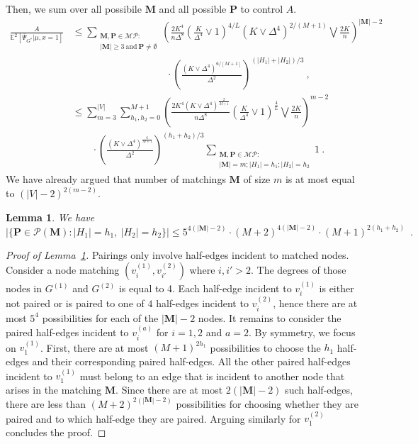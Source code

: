 \documentclass{article}
\newtheorem{lemma}{Lemma}
\begin{document}
Then, we sum over all possibile $\mathbf{M}$ and all possible $\mathbf{P}$ to control $A$. 
\begin{align*}
\frac{A}{\mathbb E^2[\overline{\Psi}_{G^*}|\mu,x=1]}&\leq  \sum_{\substack{\mathbf{M},\mathbf{P}\in \mathcal{MP}:\\|\mathbf{M}|\geq 3~\mathrm{and}~\mathbf{P} \neq \emptyset} } \left(\frac{2K^4}{n\Delta^8} \left(\frac{K}{\Delta^4}\vee 1 \right)^{4/L}(K\vee \Delta^4)^{2/(M+1)}\bigvee \frac{2K}{n} \right)^{|\mathbf{M}|-2} \\ &\hspace{4cm}  \cdot \left(\frac{(K\vee \Delta^4)^{6/[M+1]}}{\Delta^{2}} \right)^{(|H_1|+|H_2|)/3} \  , \\
&\leq 
\sum_{m=3}^{|V|} \sum_{h_1,h_2=0}^{M+1}
  \left(\frac{2K^{4}(K\vee \Delta^4)^{\tfrac{2}{M+1}}}{n\Delta^8} \left(\frac{K}{\Delta^4}\vee 1 \right)^{\tfrac{4}{L}} \bigvee \frac{2K}{n} \right)^{m-2} \\ &\quad \quad \cdot  \left(\frac{(K\vee \Delta^4)^{\tfrac{6}{M+1}}}{\Delta^{2}} \right)^{(h_1+h_2)/3} \sum_{\substack{\mathbf{M},\mathbf{P}\in \mathcal{MP}:\\|\mathbf{M}|=m; |H_1|=h_1 ; |H_2|=h_2}} 1 \  .
\end{align*}
We have already argued that number of matchings $\mathbf{M}$ of size $m$ is at most equal to $(|V|-2)^{2(m-2)}$. 
\begin{lemma}\label{lem:number_mathching}
    We have
\[
\left|\{\mathbf{P}\in \mathcal{P}(\mathbf{M}): |H_1|=h_1,\ |H_2|=h_2\}\right|\leq 5^{4(|\mathbf{M}|-2)} \cdot (M+2)^{4(|\mathbf{M}|-2)}\cdot (M+1)^{2(h_1+h_2)}\enspace . 
\]
\end{lemma}
\begin{proof}[Proof of Lemma~\ref{lem:number_mathching}]
Pairings only involve half-edges incident to matched nodes. Consider a node matching $(v_i^{(1)},v_{i'}^{(2)})$ where $i,i'>2$. The degrees of those nodes in $G^{(1)}$ and $G^{(2)}$ is equal to 4. Each half-edge incident to $v_i^{(1)}$ is either not paired or is paired to one of $4$ half-edges incident to $v_i^{(2)}$, hence there are at most $5^{4}$ possibilities for each of the $|\mathbf{M}|-2$ nodes. It remains to consider the paired half-edges incident to $v_{i}^{(a)}$ for $i=1,2$ and $a=2$. By symmetry, we focus on $v_{1}^{(1)}$. First, 
there are at most $(M+1)^{2h_1}$ possibilities to choose the $h_1$ half-edges and their corresponding paired half-edges. All the other paired half-edges incident to $v_{1}^{(1)}$ must belong to an edge that is incident to another node that arises in the matching $\mathbf{M}$. Since there are at most $2(|\mathbf{M}|-2)$ such half-edges, there are less than $(M+2)^{2(|\mathbf{M}|-2)}$ possibilities for choosing whether they are paired and to which half-edge they are paired. Arguing similarly for $v_1^{(2)}$ concludes the proof.
\end{proof}
\end{document}
